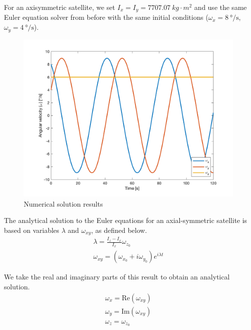 For an axisymmetric satellite, we set $I_{x} = I_{y} = \qty{7707.07}{kg \cdot m^2}$ and use the same Euler equation solver from before with the same initial conditions ($\omega_{x} = \qty{8}{\degree\per\second}$, $\omega_{y} = \qty{4}{\degree\per\second}$).

\begin{figure}[H]
\centering
\includegraphics[scale=0.6]{Images/ps3_problem1.png}
\caption{Numerical solution results}
\label{fig:ps3_problem1}
\end{figure}

The analytical solution to the Euler equations for an axial-symmetric satellite is based on variables $\lambda$ and $\omega_{xy}$, as defined below.
\begin{align*}
    \lambda = \frac{I_{z} - I_{x}}{I_{x}} \omega_{z_{0}} \\
    \omega_{xy} = (\omega_{x_{0}} + i \omega_{y_{0}}) e^{i \lambda t}
\end{align*}

We take the real and imaginary parts of this result to obtain an analytical solution.
\begin{align*}
    \omega_x = \text{Re}(\omega_{xy}) \\
    \omega_y = \text{Im}(\omega_{xy}) \\ 
    \omega_z = \omega_{z_{0}}
\end{align*}

